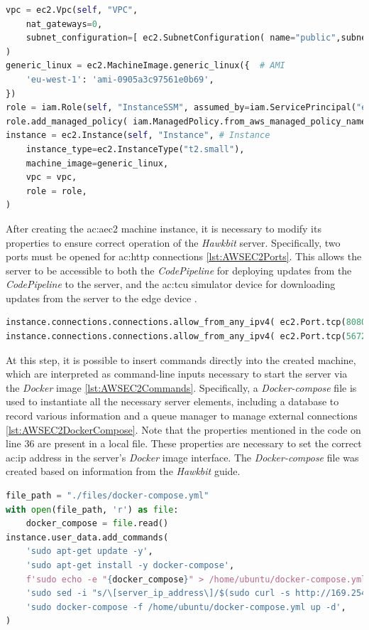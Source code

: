 \begin{lstlisting}[language=Python, caption={Code for the creation the \textit{EC2 Hawkbit} server istance}, label=lst:AWSEC2Istance]
vpc = ec2.Vpc(self, "VPC",
    nat_gateways=0,
    subnet_configuration=[ ec2.SubnetConfiguration( name="public",subnet_type=ec2.SubnetType.PUBLIC ) ]
)
generic_linux = ec2.MachineImage.generic_linux({  # AMI
    'eu-west-1': 'ami-0905a3c97561e0b69',
})
role = iam.Role(self, "InstanceSSM", assumed_by=iam.ServicePrincipal("ec2.amazonaws.com")) 
role.add_managed_policy( iam.ManagedPolicy.from_aws_managed_policy_name( "AmazonSSMManagedInstanceCore" ) )
instance = ec2.Instance(self, "Instance", # Instance
    instance_type=ec2.InstanceType("t2.small"),
    machine_image=generic_linux,
    vpc = vpc,
    role = role,
)
\end{lstlisting}

After creating the \gls{ac:aec2} machine instance, it is necessary to modify its properties to ensure correct operation of the \textit{Hawkbit} server. Specifically, two ports must be opened for \gls{ac:http} connections \ref{lst:AWSEC2Ports}. This allows the server to be accessible to both the \textit{CodePipeline} for deploying updates from the \textit{CodePipeline} to the server, and the \gls{ac:tcu} simulator device for downloading updates from the server to the edge device \cite{HawkbitDockerCompose}.
\begin{lstlisting}[language=Python, caption={Code for opening the server doors}, label=lst:AWSEC2Ports]
instance.connections.connections.allow_from_any_ipv4( ec2.Port.tcp(8080), "Allow inbound HTTP traffic" )
instance.connections.connections.allow_from_any_ipv4( ec2.Port.tcp(5672), "Allow inbound HTTP traffic" )
\end{lstlisting}

At this step, it is possible to insert commands directly into the created machine, which are interpreted as command-line inputs necessary to start the server via the \textit{Docker} image \ref{lst:AWSEC2Commands}. Specifically, a \textit{Docker-compose} file is used to instantiate all the necessary server elements, including a database to record various information and a queue manager to manage external connections \ref{lst:AWSEC2DockerCompose}. Note that the properties mentioned in the code on line 36 are present in a local file. These properties are necessary to set the correct \gls{ac:ip} address in the server's \textit{Docker} image interface. The \textit{Docker-compose} file was created based on information from the \textit{Hawkbit} guide.
\begin{lstlisting}[language=Python, caption={Code to run commands on the machine}, label=lst:AWSEC2Commands]
file_path = "./files/docker-compose.yml"
with open(file_path, 'r') as file:
    docker_compose = file.read()
instance.user_data.add_commands(
    'sudo apt-get update -y',
    'sudo apt-get install -y docker-compose',
    f'sudo echo -e "{docker_compose}" > /home/ubuntu/docker-compose.yml',
    'sudo sed -i "s/\[server_ip_address\]/$(sudo curl -s http://169.254.169.254/latest/meta-data/public-ipv4)/g" /home/ubuntu/docker-compose.yml',
    'sudo docker-compose -f /home/ubuntu/docker-compose.yml up -d',
)
\end{lstlisting}

